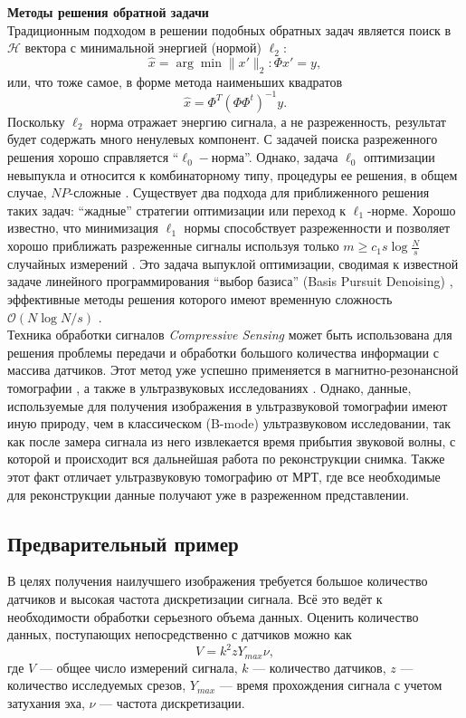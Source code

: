 \documentclass[14pt]{matmex-diploma}
\begin{document}
\textbf{Методы решения обратной задачи}\\
Традиционным подходом в решении подобных обратных задач является поиск в $\mathcal{H}$ вектора с минимальной энергией (нормой)  $\ell_2$: $$ \hat{x} = \arg\!\min{\| x'\|_2} : \Phi x' = y,$$ или, что тоже самое, в форме метода наименьших квадратов
$$\hat{x} = \Phi^T (\Phi\Phi^t)^{-1}y.$$
Поскольку $\ell_2$ норма  отражает энергию сигнала, а не разреженность, результат будет содержать много ненулевых компонент. С задачей поиска разреженного решения хорошо справляется ``$\ell_0-$норма''. Однако, задача $\ell_0$ оптимизации невыпукла и относится к комбинаторному типу, процедуры ее решения, в общем случае, $NP$-сложные \cite{natarajan1995sparse}. Существует два подхода для приближенного решения таких задач: ``жадные'' стратегии оптимизации\cite{mallat1993matching} или переход к $\ell_1$-норме. Хорошо известно, что минимизация $\ell_1$ нормы способствует разреженности \cite{donoho2006most} и позволяет хорошо приближать разреженные сигналы используя только $m \geq c_1 s \log{\frac{N}{s}}$ случайных измерений \cite{donoho2006compressed}\cite{candes2006robust}. Это задача выпуклой оптимизации, сводимая к известной задаче линейного программирования ``выбор базиса'' (Basis Pursuit Denoising) \cite{chen2001atomic}, эффективные методы решения которого имеют временную сложность $\mathcal{O}(N\log{N/s})$ \cite{berinde2008practical}.\\

Техника обработки сигналов \textit{Compressive Sensing} может быть использована для решения проблемы передачи и обработки большого количества информации с массива датчиков. Этот метод уже успешно применяется в магнитно-резонансной томографии \cite{lustig2007sparse, lustig2008compressed}, а также в ультразвуковых исследованиях \cite{quinsac2010compressed}. Однако, данные, используемые для получения изображения в ультразвуковой томографии имеют иную природу, чем в классическом (B-mode) ультразвуковом исследовании, так как после замера сигнала из него извлекается время прибытия звуковой волны, с которой и происходит вся дальнейшая работа по реконструкции снимка. Также этот факт отличает ультразвуковую томографию от МРТ, где все необходимые для реконструкции данные получают уже в разреженном представлении.

\subsection{Предварительный пример}

В целях получения наилучшего изображения требуется большое количество датчиков и высокая частота дискретизации сигнала. Всё это ведёт к необходимости обработки серьезного объема данных. Оценить количество данных, поступающих непосредственно с датчиков можно как
\[ V = k^2  z  Y_{max} \nu,   \]
где $V$ --- общее число измерений сигнала, $k$ --- количество датчиков, $z$ --- количество исследуемых срезов, $Y_{max}$ --- время прохождения сигнала с учетом затухания эха, $\nu$ --- частота дискретизации. \\
\end{document}
